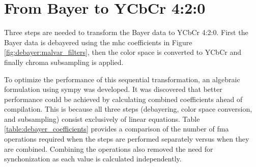 \section{From Bayer to YCbCr 4:2:0}
Three steps are needed to transform the Bayer data to YCbCr 4:2:0.
First the Bayer data is debayered using the \gls{mhc} coefficients in Figure \ref{fig:debayer:malvar_filters}, then the color space is converted to YCbCr and finally chroma subsampling is applied.

To optimize the performance of this sequential transformation, an algebraic formulation using \gls{sympy} was developed.
It was discovered that better performance could be achieved by calculating combined coefficients ahead of compilation.
This is because all three steps (debayering, color space conversion, and subsampling) consist exclusively of linear equations.
Table \ref{table:debayer_coefficients} provides a comparison of the number of \gls{fma} operations required when the steps are performed separately versus when they are combined.
Combining the operations also removed the need for synchonization as each value is calculated independently.

